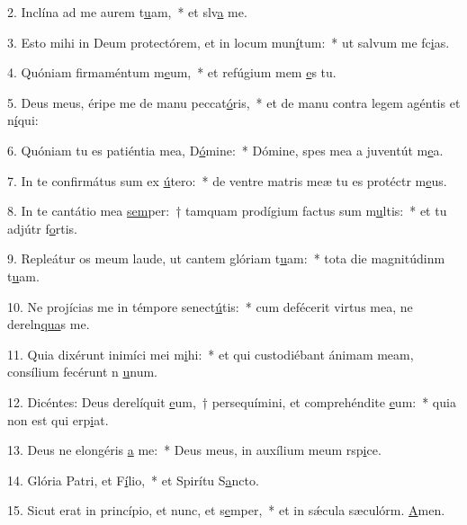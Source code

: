 2. Inclína ad me aurem t\uline{u}am,~* et slv\uline{a} me.\par 
3. Esto mihi in Deum protectórem, et in locum mun\uline{í}tum:~* ut salvum me fc\uline{i}as.\par 
4. Quóniam firmaméntum m\uline{e}um,~* et refúgium mem \uline{e}s tu.\par 
5. Deus meus, éripe me de manu peccat\uline{ó}ris,~* et de manu contra legem agéntis et n\uline{í}qui:\par 
6. Quóniam tu es patiéntia mea, D\uline{ó}mine:~* Dómine, spes mea a juventút m\uline{e}a.\par 
7. In te confirmátus sum ex \uline{ú}tero:~* de ventre matris meæ tu es protéctr m\uline{e}us.\par 
8. In te cantátio mea \uline{sem}per:~† tamquam prodígium factus sum m\uline{u}ltis:~* et tu adjútr f\uline{o}rtis.\par 
9. Repleátur os meum laude, ut cantem glóriam t\uline{u}am:~* tota die magnitúdinm t\uline{u}am.\par 
10. Ne projícias me in témpore senect\uline{ú}tis:~* cum defécerit virtus mea, ne dereln\uline{qua}s me.\par 
11. Quia dixérunt inimíci mei m\uline{i}hi:~* et qui custodiébant ánimam meam, consílium fecérunt n \uline{u}num.\par 
12. Dicéntes: Deus derelíquit \uline{e}um,~† persequímini, et comprehéndite \uline{e}um:~* quia non est qui erp\uline{i}at.\par 
13. Deus ne elongéris \uline{a} me:~* Deus meus, in auxílium meum rsp\uline{i}ce.\par 
14. Glória Patri, et F\uline{í}lio,~* et Spirítu S\uline{a}ncto.\par 
15. Sicut erat in princípio, et nunc, et s\uline{e}mper,~* et in sǽcula sæculórm. \uline{A}men.\par 
